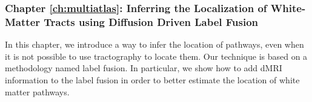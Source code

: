 \subsubsection{Chapter \ref{ch:multiatlas}: Inferring the Localization of White-Matter Tracts using Diffusion Driven Label Fusion}
In this chapter, we introduce a way to infer the location of pathways, even
when it is not possible to use tractography to locate them. Our technique is
based on a methodology named label fusion. In particular, we show how to add
dMRI information to the label fusion in order to better estimate the location
of white matter pathways.


%



